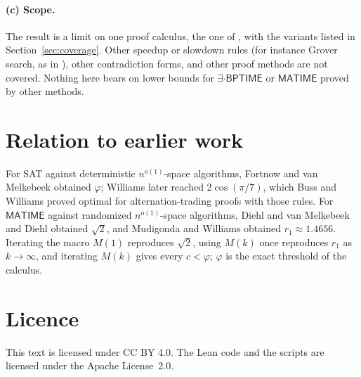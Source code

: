 \documentclass[11pt]{article}
\theoremstyle{definition}
\newcommand{\BPTIME}{\mathsf{BPTIME}}
\newcommand{\MATIME}{\mathsf{MATIME}}
\begin{document}
\paragraph{(c) Scope.}
The result is a limit on one proof calculus, the one of \cite[Definition~2.14 and \S5]{MW21}, with the variants listed in Section~\ref{sec:coverage}. Other speedup or slowdown rules (for instance Grover search, as in \cite[\S4]{MW21}), other contradiction forms, and other proof methods are not covered. Nothing here bears on lower bounds for $\exists\cdot\BPTIME$ or $\MATIME$ proved by other methods.

\section{Relation to earlier work}

For SAT against deterministic $n^{o(1)}$-space algorithms, Fortnow and van Melkebeek \cite{FvM00,FLvMV05} obtained $\varphi$; Williams later reached $2\cos(\pi/7)$, which Buss and Williams \cite{BW15} proved optimal for alternation-trading proofs with those rules. For $\MATIME$ against randomized $n^{o(1)}$-space algorithms, Diehl and van Melkebeek \cite{DvM06} and Diehl \cite{Die07} obtained $\sqrt2$, and Mudigonda and Williams \cite{MW21} obtained $r_1\approx1.4656$. Iterating the macro $M(1)$ reproduces $\sqrt2$, using $M(k)$ once reproduces $r_1$ as $k\to\infty$, and iterating $M(k)$ gives every $c<\varphi$; $\varphi$ is the exact threshold of the calculus.

\section*{Licence}
This text is licensed under CC BY 4.0. The Lean code and the scripts are licensed under the Apache License~2.0.
\end{document}
